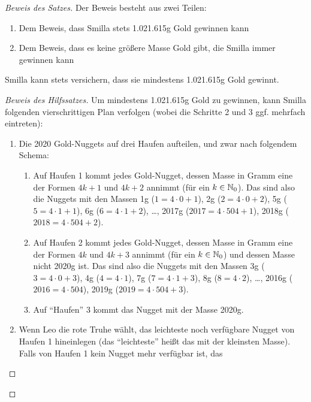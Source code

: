 \begin{proof}[Beweis des Satzes]
    Der Beweis besteht aus zwei Teilen:
    \begin{enumerate}
        \item Dem Beweis, dass Smilla stets 1.021.615g Gold gewinnen kann
        \item Dem Beweis, dass es keine größere Masse Gold gibt, die Smilla immer gewinnen kann
    \end{enumerate}
    \renewcommand{\qedsymbol}{$\square$}
    \begin{lem}\label{smilla}
        Smilla kann stets versichern, dass sie mindestens 1.021.615g Gold gewinnt.
    \end{lem}
    \begin{proof}[Beweis des Hilfssatzes]
        Um mindestens 1.021.615g Gold zu gewinnen, kann Smilla folgenden vierschrittigen Plan verfolgen (wobei die 
        Schritte 2 und 3 ggf. mehrfach eintreten):
        \begin{enumerate}
            \item Die 2020 Gold-Nuggets auf drei Haufen aufteilen, und zwar nach folgendem Schema:
            \begin{enumerate}
                \item Auf Haufen 1 kommt jedes Gold-Nugget, dessen Masse in Gramm eine der Formen $4k+1$ und $4k+2$ 
                annimmt (für ein $k \in \mathbb{N}_0$). Das sind also die Nuggets mit den Massen 1g ($1 = 4 \cdot 0+1$), 2g 
                ($2 = 4\cdot 0+2$), 5g ($5 = 4 \cdot 1+1$), 6g ($6=4\cdot 1+2$), \dots, 2017g ($2017=4\cdot 504+1$), 
                2018g ($2018=4\cdot 504+2$).
                \item Auf Haufen 2 kommt jedes Gold-Nugget, dessen Masse in Gramm eine der Formen $4k$ und $4k+3$ 
                annimmt (für ein $k \in \mathbb{N}_0$) und dessen Masse nicht 2020g ist. Das sind also die Nuggets mit den 
                Massen 3g ($3=4\cdot 0+3$), 4g ($4=4\cdot 1$), 7g ($7=4\cdot 1+3$), 8g ($8=4\cdot 2$), \dots, 2016g 
                ($2016=4\cdot 504$), 2019g ($2019=4\cdot 504+3$).
                \item Auf "`Haufen"' 3 kommt das Nugget mit der Masse 2020g.
            \end{enumerate}
            \item Wenn Leo die rote Truhe wählt, das leichteste noch verfügbare Nugget von Haufen 1 hineinlegen (das 
            "`leichteste"' heißt das mit der kleinsten Masse). Falls von Haufen 1 kein Nugget mehr verfügbar ist, das 

\end{enumerate}
\end{proof}
\end{proof}
